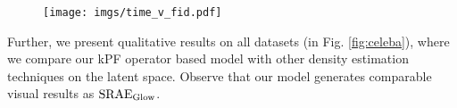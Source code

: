 \begin{figure}[b]
\begin{minipage}{0.55\textwidth}
        \label{tab:fid_table}
    \end{minipage}
    \hfill
    \begin{minipage}{0.42\textwidth}
        \texttt{[image: imgs/time\_v\_fid.pdf]}
          \vspace{-14pt}
        \label{fig:runtime}
    \end{minipage}
\end{figure}
%
%
Further, we present qualitative results on all datasets (in Fig. \ref{fig:celeba}), where we compare our kPF operator based model with other density estimation techniques on the latent space. Observe that our model
generates comparable visual results as $\textrm{SRAE}_{\rm Glow}$.

